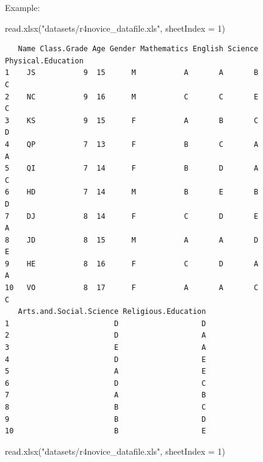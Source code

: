 \documentclass[
  letterpaper,
  DIV=11,
  numbers=noendperiod]{scrreprt}
\newenvironment{Shaded}{\begin{snugshade}}{\end{snugshade}}
\newcommand{\AttributeTok}[1]{\textcolor[rgb]{0.40,0.45,0.13}{#1}}
\newcommand{\DecValTok}[1]{\textcolor[rgb]{0.68,0.00,0.00}{#1}}
\newcommand{\FunctionTok}[1]{\textcolor[rgb]{0.28,0.35,0.67}{#1}}
\newcommand{\NormalTok}[1]{\textcolor[rgb]{0.00,0.23,0.31}{#1}}
\newcommand{\StringTok}[1]{\textcolor[rgb]{0.13,0.47,0.30}{#1}}
\begin{document}
Example:

\begin{Shaded}
\begin{Highlighting}[]
\FunctionTok{read.xlsx}\NormalTok{(}\StringTok{"datasets/r4novice\_datafile.xls"}\NormalTok{, }\AttributeTok{sheetIndex =} \DecValTok{1}\NormalTok{)}
\end{Highlighting}
\end{Shaded}

\begin{verbatim}
   Name Class.Grade Age Gender Mathematics English Science Physical.Education
1    JS           9  15      M           A       A       B                  C
2    NC           9  16      M           C       C       E                  C
3    KS           9  15      F           A       B       C                  D
4    QP           7  13      F           B       C       A                  A
5    QI           7  14      F           B       D       A                  C
6    HD           7  14      M           B       E       B                  D
7    DJ           8  14      F           C       D       E                  A
8    JD           8  15      M           A       A       D                  E
9    HE           8  16      F           C       D       A                  A
10   VO           8  17      F           A       A       C                  C
   Arts.and.Social.Science Religious.Education
1                        D                   D
2                        D                   A
3                        E                   A
4                        D                   E
5                        A                   E
6                        D                   C
7                        A                   B
8                        B                   C
9                        B                   D
10                       B                   E
\end{verbatim}

\begin{Shaded}
\begin{Highlighting}[]
\FunctionTok{read.xlsx}\NormalTok{(}\StringTok{"datasets/r4novice\_datafile.xls"}\NormalTok{, }\AttributeTok{sheetIndex =} \DecValTok{1}\NormalTok{)}
\end{Highlighting}
\end{Shaded}
\end{document}
